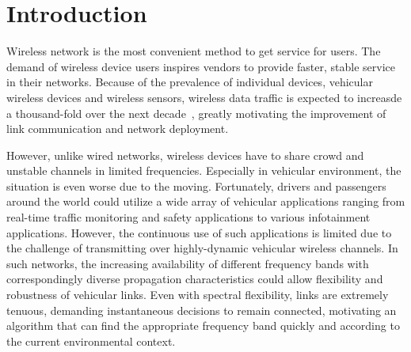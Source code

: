 \chapter{Introduction} \label{ch:introduction}

Wireless network is the most convenient method to get service for users.
The demand of wireless device users inspires vendors to provide faster,
stable service in their networks. Because of the prevalence of individual
devices, vehicular wireless devices and wireless sensors, wireless data
traffic is expected to increasde a thousand-fold over the next decade~\cite{metis},
greatly motivating the improvement of link communication and network
deployment.

However, unlike wired networks, wireless devices have to share crowd
and unstable channels in limited frequencies. Especially in vehicular
environment, the situation is even worse due to the moving. 
Fortunately, drivers and passengers around the world could utilize a 
wide array of vehicular applications ranging from real-time traffic 
monitoring and safety applications to various infotainment applications.
However, the continuous use of such applications is limited due to the
challenge of transmitting over highly-dynamic vehicular wireless channels. 
In such networks, the increasing availability of different 
frequency bands with correspondingly diverse propagation characteristics could allow flexibility and 
robustness of vehicular links. Even with spectral flexibility, links are extremely tenuous, 
demanding instantaneous decisions to remain connected, motivating an algorithm that
can find the appropriate frequency band quickly and according to the current environmental context.

